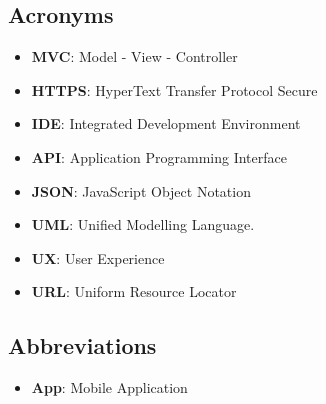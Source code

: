 \documentclass[numbers=noenddot, 12pt, a4paper, oneside]{scrbook}
\begin{document}
\subsection*{Acronyms}
\begin{itemize}
	\item \textbf{MVC}: Model - View - Controller
	\item \textbf{HTTPS}: HyperText Transfer Protocol Secure
	\item \textbf{IDE}: Integrated Development Environment
	\item \textbf{API}: Application Programming Interface
	\item \textbf{JSON}: JavaScript Object Notation
	\item \textbf{UML}: Unified Modelling Language.
	\item \textbf{UX}: User Experience
	\item \textbf{URL}: Uniform Resource Locator
\end{itemize}
\subsection*{Abbreviations}
\begin{itemize}
	\item \textbf{App}: Mobile Application 
\end{itemize}
\end{document}
